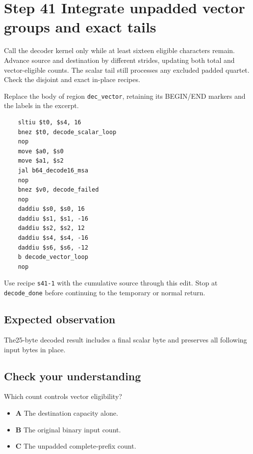 \section{Step 41 Integrate unpadded vector groups and exact tails}\label{base64-s41}

Call the decoder kernel only while at least sixteen eligible characters remain. Advance source and destination by different strides, updating both total and vector-eligible counts. The scalar tail still processes any excluded padded quartet. Check the disjoint and exact in-place recipes.

Replace the body of region \texttt{dec\_vector}, retaining its BEGIN/END markers and the labels in the excerpt.

\begin{verbatim}
    sltiu $t0, $s4, 16
    bnez $t0, decode_scalar_loop
    nop
    move $a0, $s0
    move $a1, $s2
    jal b64_decode16_msa
    nop
    bnez $v0, decode_failed
    nop
    daddiu $s0, $s0, 16
    daddiu $s1, $s1, -16
    daddiu $s2, $s2, 12
    daddiu $s4, $s4, -16
    daddiu $s6, $s6, -12
    b decode_vector_loop
    nop
\end{verbatim}

Use recipe \texttt{s41-1} with the cumulative source through this edit. Stop at \texttt{decode\_done} before continuing to the temporary or normal return.

\subsection{Expected observation}
The25-byte decoded result includes a final scalar byte and preserves all following input bytes in place.

\subsection{Check your understanding}
Which count controls vector eligibility?

\begin{itemize}
  \item \textbf{A} The destination capacity alone.
  \item \textbf{B} The original binary input count.
  \item \textbf{C} The unpadded complete-prefix count.
\end{itemize}
